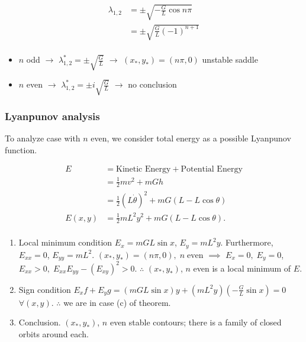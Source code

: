 \documentclass[12pt,twoside]{article}
\begin{document}
\begin{equation*}
  \begin{aligned}
    \lambda_{1,2}&=\pm\sqrt{-\frac{G}{L}\cos{n\pi}} \\
    &= \pm\sqrt{\frac{G}{L}{(-1)}^{n+1}}  \\
  \end{aligned}
\end{equation*}

\begin{itemize}
\item $n$ odd $\longrightarrow$ $\lambda^*_{1,2}=\pm\sqrt{\frac{G}{L}}$
  $\longrightarrow$ $(x_*,y_*)=(n\pi,0)$ unstable saddle
\item $n$ even $\longrightarrow$ $\lambda^*_{1,2}=\pm i\sqrt{\frac{G}{L}}$
  $\longrightarrow$ no conclusion
\end{itemize}

\subsubsection*{Lyanpunov analysis}
To analyze case with $n$ even, we consider total energy as a possible Lyanpunov
function.

\begin{equation*}
  \begin{aligned}
    E &= \text{Kinetic Energy} + \text{Potential Energy} \\
    &= \frac{1}{2}mv^2 + mGh \\
    &= \frac{1}{2}{(L\dot{\theta})}^2 + mG(L-L\cos\theta) \\
    E(x,y) &= \frac{1}{2}mL^2y^2 + mG(L-L\cos\theta). \\
  \end{aligned}
\end{equation*}

\begin{enumerate}
\item Local minimum condition $E_x=mGL\sin x$, $E_y=mL^2y$. Furthermore,
  $E_{xx}=0$, $E_{yy}=mL^2$. $(x_*,y_*)=(n\pi,0),\;n\;\text{even}$ $\implies$
  $E_x=0,\;E_y=0$, $E_{xx}>0,\;E_{xx}E_{yy}-{(E_{xy})}^2>0$. $\therefore$
  $(x_*,y_*)$, $n$ even is a local minimum of $E$.
\item Sign condition $E_x f + E_y g = (mGL\sin x)y + (mL^2y)(-\frac{G}{L}\sin
  x)=0$ $\forall (x,y)$. $\therefore$ we are in case (c) of theorem.
\item Conclusion. $(x_*,y_*)$, $n$ even stable contours; there is a family of
  closed orbits around each.
\end{enumerate}
\end{document}
